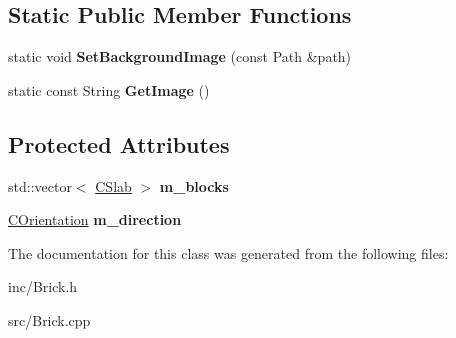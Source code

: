 \subsection*{Static Public Member Functions}
\begin{DoxyCompactItemize}
\item 
\hypertarget{classCBrick_ac96d1acb6be0e541a84bf8d4ab53d3fd}{static void {\bfseries Set\-Background\-Image} (const Path \&path)}\label{classCBrick_ac96d1acb6be0e541a84bf8d4ab53d3fd}

\item 
\hypertarget{classCBrick_ad372d76a714fba18332748825145c675}{static const String {\bfseries Get\-Image} ()}\label{classCBrick_ad372d76a714fba18332748825145c675}

\end{DoxyCompactItemize}
\subsection*{Protected Attributes}
\begin{DoxyCompactItemize}
\item 
\hypertarget{classCBrick_a8204bd386e65da4bbb6dbe1a0f973535}{std\-::vector$<$ \hyperlink{classCSlab}{C\-Slab} $>$ {\bfseries m\-\_\-blocks}}\label{classCBrick_a8204bd386e65da4bbb6dbe1a0f973535}

\item 
\hypertarget{classCBrick_a61a9a82c266c4f0986833426e20fc583}{\hyperlink{classCOrientation}{C\-Orientation} {\bfseries m\-\_\-direction}}\label{classCBrick_a61a9a82c266c4f0986833426e20fc583}

\end{DoxyCompactItemize}


The documentation for this class was generated from the following files\-:\begin{DoxyCompactItemize}
\item 
inc/Brick.\-h\item 
src/Brick.\-cpp\end{DoxyCompactItemize}

